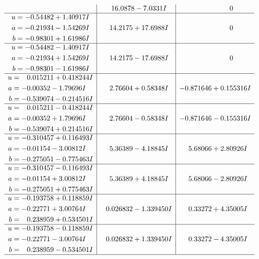 \documentclass[1p]{elsarticle_modified}
\theoremstyle{definition}
\begin{document}
$$\begin{array}{c|c|c}
 & \phantom{-}16.0878 - 7.0331 I & \phantom{-0.000000 } 0 \\ \hline\begin{aligned}
u &= -0.54482 + 1.40917 I \\
a &= -0.21934 - 1.54269 I \\
b &= -0.98301 + 1.61986 I\end{aligned}
 & \phantom{-}14.2175 + 17.6988 I & \phantom{-0.000000 } 0 \\ \hline\begin{aligned}
u &= -0.54482 - 1.40917 I \\
a &= -0.21934 + 1.54269 I \\
b &= -0.98301 - 1.61986 I\end{aligned}
 & \phantom{-}14.2175 - 17.6988 I & \phantom{-0.000000 } 0 \\ \hline\begin{aligned}
u &= \phantom{-}0.015211 + 0.418244 I \\
a &= -0.00352 - 1.79696 I \\
b &= -0.539074 - 0.214516 I\end{aligned}
 & \phantom{-}2.76604 + 0.58348 I & -0.871646 + 0.155316 I \\ \hline\begin{aligned}
u &= \phantom{-}0.015211 - 0.418244 I \\
a &= -0.00352 + 1.79696 I \\
b &= -0.539074 + 0.214516 I\end{aligned}
 & \phantom{-}2.76604 - 0.58348 I & -0.871646 - 0.155316 I \\ \hline\begin{aligned}
u &= -0.310457 + 0.116493 I \\
a &= -0.01154 - 3.00812 I \\
b &= -0.275051 - 0.775463 I\end{aligned}
 & \phantom{-}5.36389 - 4.18845 I & \phantom{-}5.68066 + 2.80926 I \\ \hline\begin{aligned}
u &= -0.310457 - 0.116493 I \\
a &= -0.01154 + 3.00812 I \\
b &= -0.275051 + 0.775463 I\end{aligned}
 & \phantom{-}5.36389 + 4.18845 I & \phantom{-}5.68066 - 2.80926 I \\ \hline\begin{aligned}
u &= -0.193758 + 0.118859 I \\
a &= -0.22771 + 3.00764 I \\
b &= \phantom{-}0.238959 + 0.534501 I\end{aligned}
 & \phantom{-}0.026832 - 1.339450 I & \phantom{-}0.33272 + 4.35005 I \\ \hline\begin{aligned}
u &= -0.193758 - 0.118859 I \\
a &= -0.22771 - 3.00764 I \\
b &= \phantom{-}0.238959 - 0.534501 I\end{aligned}
 & \phantom{-}0.026832 + 1.339450 I & \phantom{-}0.33272 - 4.35005 I\\
 \hline 
 \end{array}$$\newpage\newpage\renewcommand{\arraystretch}{1}
\end{document}
